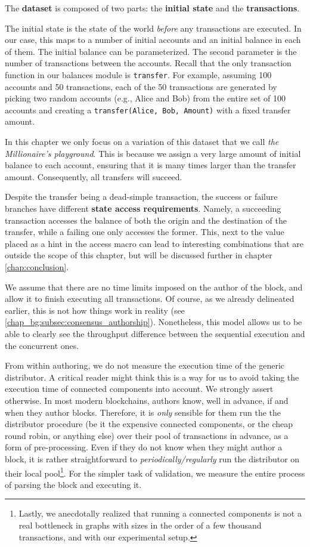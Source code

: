 The \textbf{dataset} is composed of two parts: the \textbf{initial state} and the \textbf{transactions}.

The initial state is the state of the world \textit{before} any transactions are executed. In our
case, this maps to a number of initial accounts and an initial balance in each of them. The initial balance can be parameterized.
The second parameter is the number of transactions between the accounts. Recall that the only
transaction function in our balances module is \texttt{transfer}. For example, assuming 100 accounts
and 50 transactions, each of the 50 transactions are generated by picking two random accounts (e.g., Alice and Bob) from the entire set of 100 accounts and creating a \texttt{transfer(Alice, Bob, Amount)} with a fixed transfer amount.  

In this chapter we only focus on a variation of this dataset that we call \textit{the Millionaire's playground}.
This is because we assign a very large amount of initial balance to each account, ensuring that it
is many times larger than the transfer amount. Consequently, all transfers will succeed.

\begin{remark}
	Despite the transfer being a dead-simple transaction, the success or failure branches have
	different \textbf{state access requirements}. Namely, a succeeding transaction accesses the
	balance of both the origin and the destination of the transfer, while a failing one only
	accesses the former. This, next to the value placed as a hint in the access macro can lead to
	interesting combinations that are outside the scope of this chapter, but will be discussed 
	further in chapter \ref{chap:conclusion}.
\end{remark}

We assume that there are no time limits imposed on the author of the block, and allow it to finish
executing all transactions. Of course, as we already delineated earlier, this is not how things work
in reality (see \ref{chap_bg:subsec:consensus_authorship}). Nonetheless, this model allows us to be
able to clearly see the throughput difference between the sequential execution and the concurrent
ones.

From within authoring, we do not measure the execution time of the generic distributor. A critical
reader might think this is a way for us to avoid taking the execution time of connected components
into account. We strongly assert otherwise. In most modern blockchains, authors know, well in
advance, if and when they author blocks. Therefore, it is \textit{only} sensible for them run the
the distributor procedure (be it the expensive connected components, or the cheap round robin, or
anything else) over their pool of transactions in advance, as a form of pre-processing. Even if they
do not know when they might author a block, it is rather straightforward to \textit{periodically/regularly} run the
distributor on their local pool\footnote{Lastly, we anecdotally realized that running a
connected components is not a real bottleneck in graphs with sizes in the order of a few
thousand transactions, and with our experimental setup.}. For the simpler task of validation, we measure the entire process of parsing the block and executing it.

